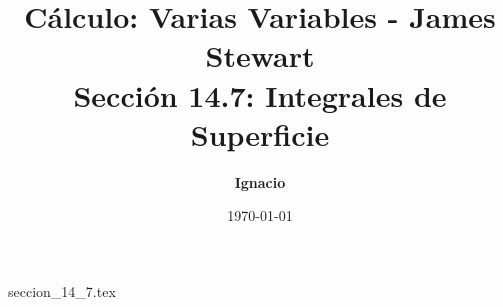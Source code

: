 \documentclass[11pt,spanish,oneside]{report}
\title{\textbf{Cálculo: Varias Variables - James Stewart} \\ \Large Sección 14.7: Integrales de Superficie}
\author{\textbf{Ignacio}}
\date{\today}
\begin{document}
\maketitle

{seccion_14_7.tex}
\end{document}
